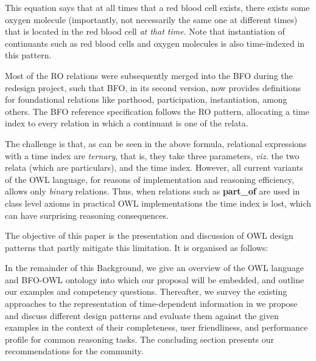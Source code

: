 This equation says that at all times that a red blood cell exists, there exists some oxygen molecule (importantly, not necessarily the same one at different times) that is located in the red blood cell \emph{at that time}. Note that instantiation of continuants such as red blood cells and oxygen molecules is also time-indexed in this pattern. 

Most of the RO relations 
were subsequently merged into the BFO during the redesign project, such that BFO, in its second version, now provides definitions for foundational 
relations like parthood, participation, instantiation, among others. The BFO reference specification follows the RO pattern, 
allocating a time index to every relation in which a continuant is one of the relata. 

The challenge is that, as can be seen in the above formula, relational expressions with a time index are \emph{ternary}, that is, they take three parameters, \emph{viz.} the two relata (which are particulars), and the time index. However, all current variants of the OWL language, for reasons of implementation and reasoning efficiency, allows only \emph{binary} relations. 
Thus, when relations such as \textbf{part\_of} are used in class level axioms
in practical OWL implementations 
the time index is lost, which can have surprising reasoning consequences. 


The objective of this paper is the presentation and discussion of OWL design patterns that partly mitigate this limitation. It is organised as follows:

In the remainder of this Background, we give an overview of the OWL language and BFO-OWL ontology into which our proposal will be embedded, and outline our examples and competency questions.
Thereafter, we survey the existing approaches to the representation of time-dependent information in
we propose and discuss different design patterns and evaluate them against the given examples in the context of their completeness, user friendliness, and performance profile for common reasoning tasks.
The concluding section presents our recommendations for the community.

